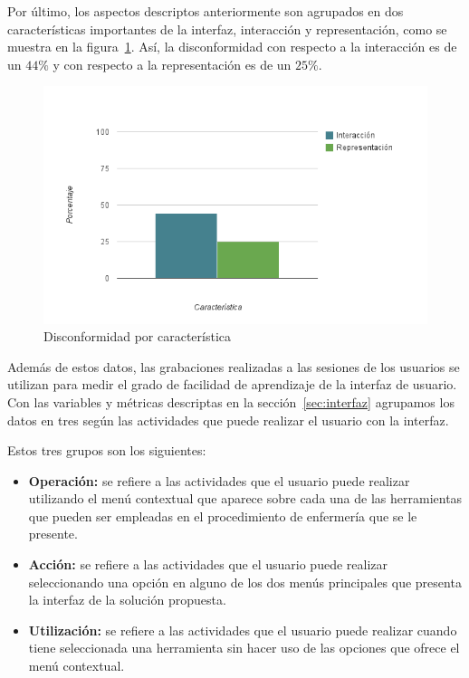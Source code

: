 Por último, los aspectos descriptos anteriormente son agrupados en dos
características importantes de la interfaz, interacción y representación, como
se muestra en la figura~\ref{fig:interfaz_disconformidad_caracteristica}.  Así,
la disconformidad con respecto a la interacción es de un  $44\%$ y con respecto
a la representación es de un  $25\%$. 

\begin{figure}[ht!]
\centering
\includegraphics[scale=0.8]{resultados/imagenes/interfaz_disconformidad_caracteristica.png}
\caption{Disconformidad por característica}
\label{fig:interfaz_disconformidad_caracteristica}
\end{figure}

Además de estos datos, las grabaciones realizadas a las sesiones de los usuarios
se utilizan para medir el grado de facilidad de aprendizaje de la interfaz de
usuario. Con las variables y métricas descriptas en la
sección~\ref{sec:interfaz} agrupamos los datos en tres según las actividades que
puede realizar el usuario con la interfaz.

Estos tres grupos son los siguientes: 

\begin{itemize}
\item \textbf{Operación:} se refiere a las actividades que el usuario puede
    realizar utilizando el menú contextual que aparece sobre cada una de las
    herramientas que pueden ser empleadas en el procedimiento de enfermería que
    se le presente.
\item \textbf{Acción:} se refiere a las actividades que el usuario puede
    realizar seleccionando una opción en alguno de los dos menús principales que
    presenta la interfaz de la solución propuesta.
\item \textbf{Utilización:} se refiere a las actividades que el usuario puede
    realizar cuando tiene seleccionada una herramienta sin hacer uso de las
    opciones que ofrece el menú contextual.
\end{itemize}

